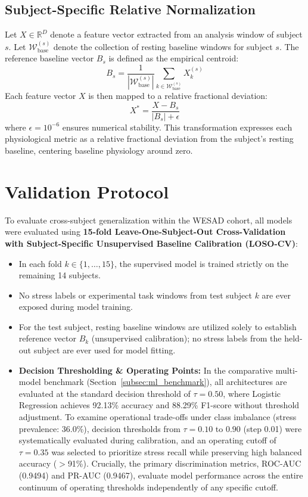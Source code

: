 \documentclass[conference]{IEEEtran}
\begin{document}
\subsection{Subject-Specific Relative Normalization}
Let $X \in \mathbb{R}^D$ denote a feature vector extracted from an analysis window of subject $s$. Let $\mathcal{W}_{\text{base}}^{(s)}$ denote the collection of resting baseline windows for subject $s$. The reference baseline vector $B_s$ is defined as the empirical centroid:
\begin{equation}
    B_s = \frac{1}{|\mathcal{W}_{\text{base}}^{(s)}|} \sum_{k \in \mathcal{W}_{\text{base}}^{(s)}} X_k^{(s)}
\end{equation}
Each feature vector $X$ is then mapped to a relative fractional deviation:
\begin{equation}
    X^* = \frac{X - B_s}{|B_s| + \epsilon}
\end{equation}
where $\epsilon = 10^{-6}$ ensures numerical stability. This transformation expresses each physiological metric as a relative fractional deviation from the subject's resting baseline, centering baseline physiology around zero.

\section{Validation Protocol}
To evaluate cross-subject generalization within the WESAD cohort, all models were evaluated using \textbf{15-fold Leave-One-Subject-Out Cross-Validation with Subject-Specific Unsupervised Baseline Calibration (LOSO-CV)}:
\begin{itemize}
    \item In each fold $k \in \{1, \dots, 15\}$, the supervised model is trained strictly on the remaining 14 subjects.
    \item No stress labels or experimental task windows from test subject $k$ are ever exposed during model training.
    \item For the test subject, resting baseline windows are utilized solely to establish reference vector $B_k$ (unsupervised calibration); no stress labels from the held-out subject are ever used for model fitting.
    \item \textbf{Decision Thresholding \& Operating Points:} In the comparative multi-model benchmark (Section~\ref{subsec:ml_benchmark}), all architectures are evaluated at the standard decision threshold of $\tau = 0.50$, where Logistic Regression achieves 92.13\% accuracy and 88.29\% F1-score without threshold adjustment. To examine operational trade-offs under class imbalance (stress prevalence: 36.0\%), decision thresholds from $\tau = 0.10$ to $0.90$ (step 0.01) were systematically evaluated during calibration, and an operating cutoff of $\tau = 0.35$ was selected to prioritize stress recall while preserving high balanced accuracy ($>$91\%). Crucially, the primary discrimination metrics, ROC-AUC (0.9494) and PR-AUC (0.9467), evaluate model performance across the entire continuum of operating thresholds independently of any specific cutoff.
\end{itemize}
\end{document}
